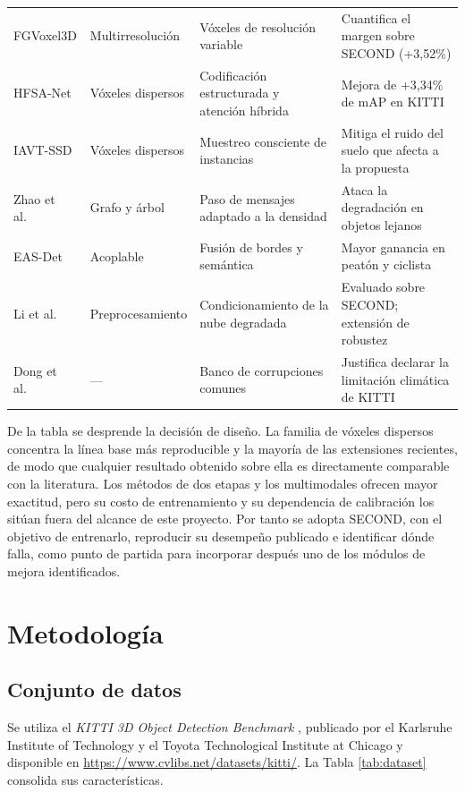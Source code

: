 \documentclass[11pt,letterpaper]{article}
\begin{document}
\begin{table}[htbp]
\begin{tabular}{@{}>{\raggedright\arraybackslash}p{2.6cm}>{\raggedright\arraybackslash}p{2.1cm}>{\raggedright\arraybackslash}p{4.6cm}>{\raggedright\arraybackslash}p{6.1cm}@{}}
FGVoxel3D \cite{ao2026} & Multirresolución & Vóxeles de resolución variable & Cuantifica el margen sobre SECOND (+3,52\%) \\
HFSA-Net \cite{yin2026} & Vóxeles dispersos & Codificación estructurada y atención híbrida & Mejora de +3,34\% de mAP en KITTI \\
IAVT-SSD \cite{wang2025iavt} & Vóxeles dispersos & Muestreo consciente de instancias & Mitiga el ruido del suelo que afecta a la propuesta \\
Zhao et al.\ \cite{zhao2025} & Grafo y árbol & Paso de mensajes adaptado a la densidad & Ataca la degradación en objetos lejanos \\
EAS-Det \cite{wang2025eas} & Acoplable & Fusión de bordes y semántica & Mayor ganancia en peatón y ciclista \\
Li et al.\ \cite{li2026} & Preprocesamiento & Condicionamiento de la nube degradada & Evaluado sobre SECOND; extensión de robustez \\
Dong et al.\ \cite{dong2023} & --- & Banco de corrupciones comunes & Justifica declarar la limitación climática de KITTI \\
\bottomrule
\end{tabular}
\end{table}

De la tabla se desprende la decisión de diseño. La familia de vóxeles dispersos concentra la línea base más reproducible y la mayoría de las extensiones recientes, de modo que cualquier resultado obtenido sobre ella es directamente comparable con la literatura. Los métodos de dos etapas y los multimodales ofrecen mayor exactitud, pero su costo de entrenamiento y su dependencia de calibración los sitúan fuera del alcance de este proyecto. Por tanto se adopta SECOND, con el objetivo de entrenarlo, reproducir su desempeño publicado e identificar dónde falla, como punto de partida para incorporar después uno de los módulos de mejora identificados.

\section{Metodología}
\label{sec:metodologia}

\subsection{Conjunto de datos}

Se utiliza el \textit{KITTI 3D Object Detection Benchmark} \cite{geiger2013}, publicado por el Karlsruhe Institute of Technology y el Toyota Technological Institute at Chicago y disponible en \url{https://www.cvlibs.net/datasets/kitti/}. La Tabla \ref{tab:dataset} consolida sus características.
\end{document}
